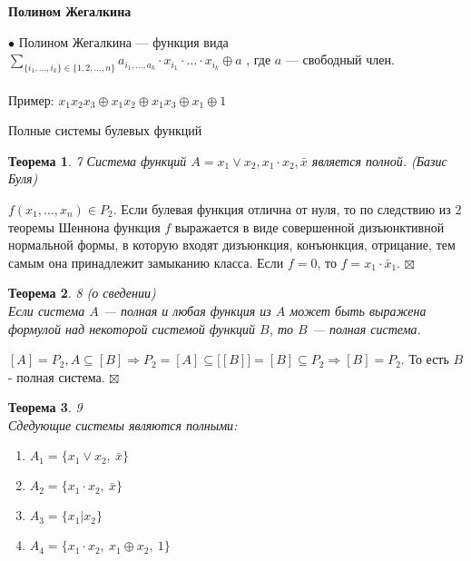 \documentclass[a4paper, 12pt]{report}
\newenvironment{Proof} %
{\par\noindent{$\blacklozenge$}} %
{\hfill$\scriptstyle\boxtimes$} %
\newtheorem*{theorem}{Теорема} %
\begin{document}
\begin{center}
    \textbf{Полином Жегалкина}
    \end{center}
$\bullet$ Полином Жегалкина — функция вида $\sum\limits_{\{i_1, \dotso, i_k\}\in
\{1, 2, \dotso, n\}} 
a_{i_1,\dotso, a_k} \cdot x_{i_1} 
\cdot \dotso \cdot x_{i_k} \oplus a$ , где $a$ — свободный член.\\\\
Пример: $x_1x_2x_3 \oplus x_1x_2 \oplus x_1x_3 \oplus x_1 \oplus 1$\\
\begin{center}
    Полные системы булевых функций
    \end{center}
    \begin{theorem}7 \quad
    Система функций $A= {x_1\vee x_2, x_1\cdot x_2, \bar x}$ является полной. (Базис Буля)
        \end{theorem}
\begin{Proof}
$f(x_1,\dotso,x_n) \in P_2$. Если булевая функция отлична от нуля, то по следствию из 2 теоремы Шеннона функция $f$ выражается  в виде совершенной дизъюнктивной нормальной формы, в которую входят дизъюнкция, конъюнкция, отрицание, тем самым она принадлежит замыканию класса. Если $f = 0$, то $f = x_1\cdot \bar x_1$.    
\end{Proof}
\begin{theorem} 8 (о сведении)\\
  Если система $A$ — полная и любая функция из $A$ может быть выражена формулой над некоторой системой функций $B$, то $B$ — полная система.  
\end{theorem}
\begin{Proof}
    $[A]=P_2, A \subseteq [B] \Rightarrow P_2 = [A] \subseteq \big[[B]\big] = [B] \subseteq P_2 \Rightarrow [B] = P_2$. То есть $B$ - полная система.
\end{Proof}
\begin{theorem}9\\
 Сдедующие системы являются полными:
 \begin{enumerate}
        \item $A_1 = \{x_1 \vee x_2,~ \bar x\}$
	  \item $A_2 = \{x_1 \cdot x_2,~ \bar x\}$
	  \item $A_3 = \{x_1|x_2\}$
	  \item $A_4 = \{x_1 \cdot x_2, ~x_1\oplus x_2, ~1\}$
  \end{enumerate}
\end{theorem}
\end{document}
